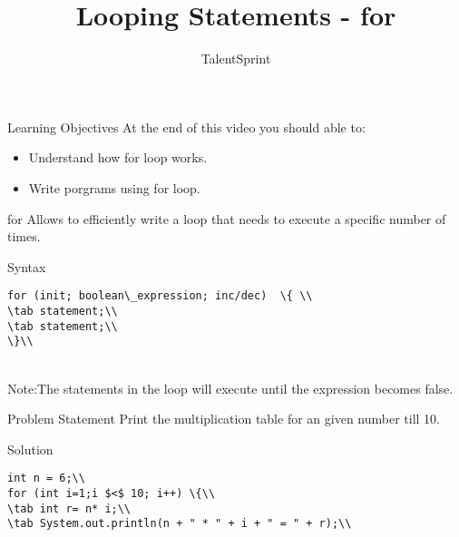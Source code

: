 \documentclass[aspectratio=169,14pt,usenames,dvipsnames]{beamer}
\title[Looping Statements - for]{Looping Statements - for}
\newcommand\tab[1][1cm]{\hspace*{#1}}
\begin{document}
{\1
\begin{frame} \vspace{35pt}

\subtitle{TalentSprint}
\maketitle
\end{frame}
}


\begin{frame}{Learning Objectives}
At the end of this video you should able to:
\begin{itemize}
\item Understand how for loop works.
\item Write porgrams using for loop.
\end{itemize}
\end{frame}


\begin{frame}{for}
Allows to efficiently write a loop that needs to
execute a specific number of times.
\end{frame}



\begin{frame}{Syntax}
\begin{lstlisting}
for (init; boolean\_expression; inc/dec)  \{ \\
\tab statement;\\
\tab statement;\\
\}\\
\end{lstlisting}\\
Note:The statements in the loop will execute
until the expression becomes false.
\end{frame}



\begin{frame}{Problem Statement}
Print the multiplication table for an given
number till 10.
\end{frame}

\begin{frame}{Solution}
\begin{lstlisting}
int n = 6;\\
for (int i=1;i $<$ 10; i++) \{\\
\tab int r= n* i;\\
\tab System.out.println(n + " * " + i + " = " + r);\\

\end{lstlisting}\\
\end{frame}
\end{document}
